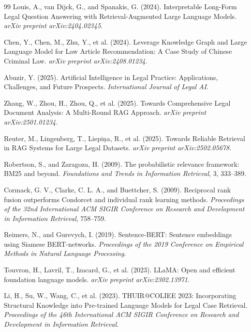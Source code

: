 \begin{thebibliography}{99}
Louis, A., van Dijck, G., and Spanakis, G. (2024).
Interpretable Long-Form Legal Question Answering with Retrieval-Augmented Large
Language Models.
\textit{arXiv preprint arXiv:2404.02345}.

Chen, Y., Chen, M., Zhu, Y., et al. (2024).
Leverage Knowledge Graph and Large Language Model for Law Article Recommendation:
A Case Study of Chinese Criminal Law.
\textit{arXiv preprint arXiv:2408.01234}.

Abuzir, Y. (2025).
Artificial Intelligence in Legal Practice: Applications, Challenges, and Future
Prospects.
\textit{International Journal of Legal AI}.

Zhang, W., Zhou, H., Zhou, Q., et al. (2025).
Towards Comprehensive Legal Document Analysis: A Multi-Round RAG Approach.
\textit{arXiv preprint arXiv:2501.01234}.

Reuter, M., Lingenberg, T., Liepi\c{n}a, R., et al. (2025).
Towards Reliable Retrieval in RAG Systems for Large Legal Datasets.
\textit{arXiv preprint arXiv:2502.05678}.

Robertson, S., and Zaragoza, H. (2009).
The probabilistic relevance framework: BM25 and beyond.
\textit{Foundations and Trends in Information Retrieval}, 3, 333--389.

Cormack, G. V., Clarke, C. L. A., and Buettcher, S. (2009).
Reciprocal rank fusion outperforms Condorcet and individual rank learning methods.
\textit{Proceedings of the 32nd International ACM SIGIR Conference on Research and
Development in Information Retrieval}, 758--759.

Reimers, N., and Gurevych, I. (2019).
Sentence-BERT: Sentence embeddings using Siamese BERT-networks.
\textit{Proceedings of the 2019 Conference on Empirical Methods in Natural Language
Processing}.

Touvron, H., Lavril, T., Izacard, G., et al. (2023).
LLaMA: Open and efficient foundation language models.
\textit{arXiv preprint arXiv:2302.13971}.

Li, H., Su, W., Wang, C., et al. (2023).
THUIR@COLIEE 2023: Incorporating Structural Knowledge into Pre-trained Language
Models for Legal Case Retrieval.
\textit{Proceedings of the 46th International ACM SIGIR Conference on Research and
Development in Information Retrieval}.


\end{thebibliography}
